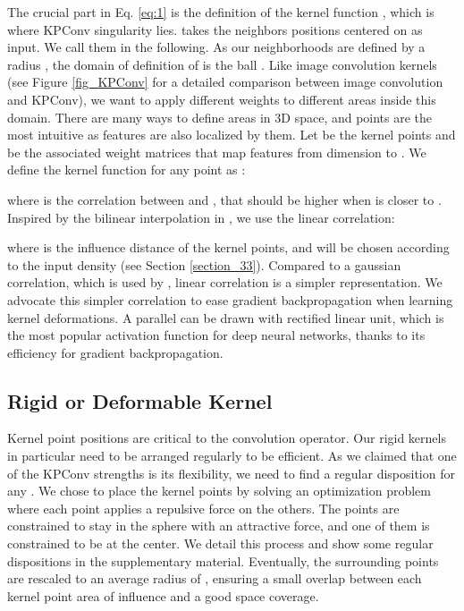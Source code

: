 \documentclass[10pt,twocolumn,letterpaper]{article}
\begin{document}
The crucial part in Eq. \ref{eq:1} is the definition of the kernel function , which is where KPConv singularity lies.  takes the neighbors positions centered on  as input. We call them  in the following. As our neighborhoods are defined by a radius , the domain of definition of  is the ball . Like image convolution kernels (see Figure \ref{fig_KPConv} for a detailed comparison between image convolution and KPConv), we want  to apply different weights to different areas inside this domain. There are many ways to define areas in 3D space, and points are the most intuitive as features are also localized by them. Let  be the kernel points and  be the associated weight matrices that map features from dimension  to . We define the kernel function  for any point  as :



\noindent
where  is the correlation between  and , that should be higher when  is closer to . Inspired by the bilinear interpolation in \cite{dai2017deformable}, we use the linear correlation:



\noindent
where  is the influence distance of the kernel points, and will be chosen according to the input density (see Section \ref{section_33}). Compared to a gaussian correlation, which is used by \cite{atzmon2018point}, linear correlation is a simpler representation. We advocate this simpler correlation to ease gradient backpropagation when learning kernel deformations. A parallel can be drawn with rectified linear unit, which is the most popular activation function for deep neural networks, thanks to its efficiency for gradient backpropagation.

\subsection{Rigid or Deformable Kernel}

Kernel point positions are critical to the convolution operator. Our rigid kernels in particular need to be arranged regularly to be efficient. As we claimed that one of the KPConv strengths is its flexibility, we need to find a regular disposition for any . We chose to place the kernel points by solving an optimization problem where each point applies a repulsive force on the others. The points are constrained to stay in the sphere with an attractive force, and one of them is constrained to be at the center. We detail this process and show some regular dispositions in the supplementary material. Eventually, the surrounding points are rescaled to an average radius of , ensuring a small overlap between each kernel point area of influence and a good space coverage.
\end{document}
